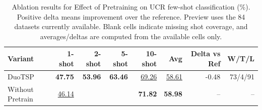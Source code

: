 \begin{table}[t]
\centering
\caption{Ablation results for Effect of Pretraining on UCR few-shot classification (\%). Positive delta means improvement over the reference. Preview uses the 84 datasets currently available. Blank cells indicate missing shot coverage, and averages/deltas are computed from the available cells only.}
\label{tab:m2_pretrain_ablation_partial_preview-ablation-main}
\begin{tabular}{lrrrrrrr}
\toprule
Variant & 1-shot & 2-shot & 5-shot & 10-shot & Avg & Delta vs Ref & W/T/L \\
\midrule
DuoTSP & \textbf{47.75} & \textbf{53.96} & \textbf{63.46} & \underline{69.26} & \underline{58.61} & -0.48 & 73/4/91 \\
Without Pretrain & \underline{46.14} &  &  & \textbf{71.82} & \textbf{58.98} & -- & -- \\
\bottomrule
\end{tabular}
\end{table}
